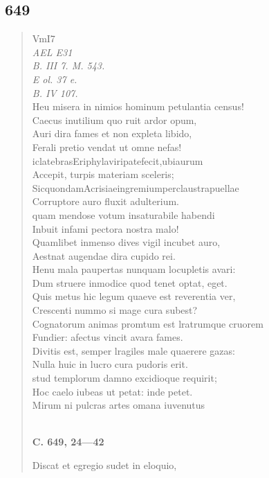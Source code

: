 \documentclass[11pt, a4paper]{report}
\begin{document}
            \subsection*{649}
      \begin{verse}
      VmI7 \\ \textit{AEL E31} \\ \textit{B. III 7. M. 543.} \\ \textit{E ol. 37 e.} \\ \textit{B. IV 107.} \\ Heu misera in nimios hominum petulantia census! \\ Caecus inutilium quo ruit ardor opum, \\ Auri dira fames et non expleta libido, \\ Ferali pretio vendat ut omne nefas! \\ iclatebrasEriphylaviripatefecit,ubiaurum \\ Accepit, turpis materiam sceleris; \\ SicquondamAcrisiaeingremiumperclaustrapuellae \\ Corruptore auro fluxit adulterium. \\ quam mendose votum insaturabile habendi \\ Inbuit infami pectora nostra malo! \\ Quamlibet inmenso dives vigil incubet auro, \\ Aestnat augendae dira cupido rei. \\ Henu mala paupertas nunquam locupletis avari: \\ Dum struere inmodice quod tenet optat, eget. \\ Quis metus hic legum quaeve est reverentia ver, \\ Crescenti nummo si mage cura subest? \\ Cognatorum animas promtum est lratrumque cruorem \\ Fundier: afectus vincit avara fames. \\ Divitis est, semper lragiles male quaerere gazas: \\ Nulla huic in lucro cura pudoris erit. \\ stud templorum damno excidioque requirit; \\ Hoc caelo iubeas ut petat: inde petet. \\ Mirum ni pulcras artes omana iuvenutus \\ 
        ﻿\pagebreak 
     \marginpar{[118]} \begin{center} \textbf{C. 649, 24—42} \end{center}Discat et egregio sudet in eloquio, \\ 
      \end{verse}
  
\end{document}
